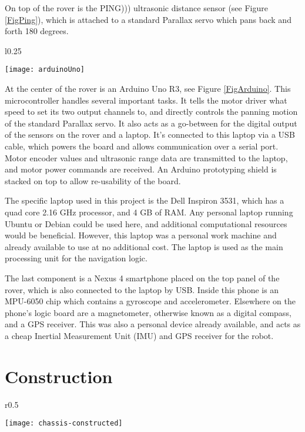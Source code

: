 On top of the rover is the PING))) ultrasonic distance sensor (see Figure \ref{FigPing}), which is attached to a standard Parallax servo which pans back and forth 180 degrees.

\begin{wrapfigure}{l}{0.25\textwidth}
	\caption{Arduino Uno R3 \cite{fig_arduino_uno}}
	\centering
	\texttt{[image: arduinoUno]}
	\label{FigArduino}
\end{wrapfigure}

At the center of the rover is an Arduino Uno R3, see Figure \ref{FigArduino}. This microcontroller handles several important tasks. It tells the motor driver what speed to set its two output channels to, and directly controls the panning motion of the standard Parallax servo. It also acts as a go-between for the digital output of the sensors on the rover and a laptop. It's connected to this laptop via a USB cable, which powers the board and allows communication over a serial port. Motor encoder values and ultrasonic range data are transmitted to the laptop, and motor power commands are received. An Arduino prototyping shield is stacked on top to allow re-usability of the board.

The specific laptop used in this project is the Dell Inspiron 3531, which has a quad core 2.16 GHz processor, and 4 GB of RAM. Any personal laptop running Ubuntu or Debian could be used here, and additional computational resources would be beneficial. However, this laptop was a personal work machine and already available to use at no additional cost. The laptop is used as the main processing unit for the navigation logic.

The last component is a Nexus 4 smartphone placed on the top panel of the rover, which is also connected to the laptop by USB. Inside this phone is an MPU-6050 chip which contains a gyroscope and accelerometer. Elsewhere on the phone's logic board are a magnetometer, otherwise known as a digital compass, and a GPS receiver. This was also a personal device already available, and acts as a cheap Inertial Measurement Unit (IMU) and GPS receiver for the robot.

\section{Construction}

\begin{wrapfigure}{r}{0.5\textwidth}
	\caption{Constructed Chassis}
	\centering
	\texttt{[image: chassis-constructed]}
	\label{FigConstructedChassis}
\end{wrapfigure}

